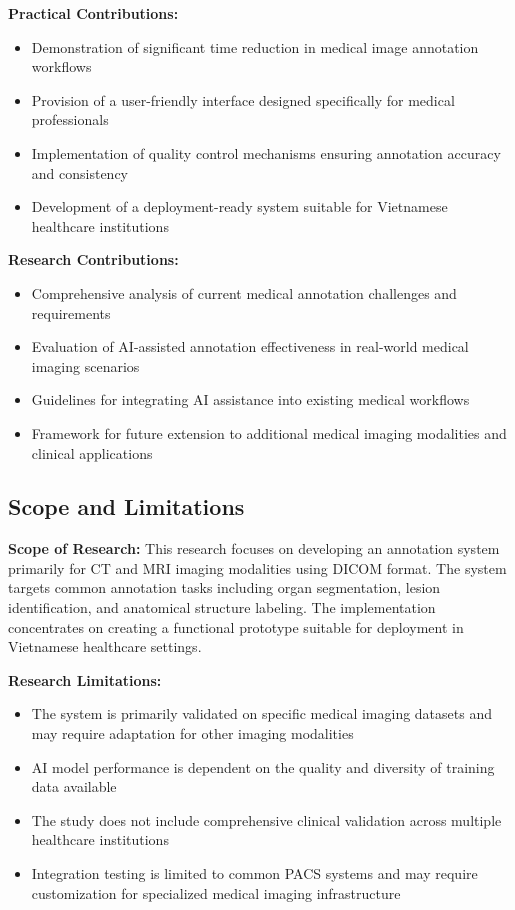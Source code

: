 \textbf{Practical Contributions:}
\begin{itemize}
    \item Demonstration of significant time reduction in medical image annotation workflows
    \item Provision of a user-friendly interface designed specifically for medical professionals
    \item Implementation of quality control mechanisms ensuring annotation accuracy and consistency
    \item Development of a deployment-ready system suitable for Vietnamese healthcare institutions
\end{itemize}

\textbf{Research Contributions:}
\begin{itemize}
    \item Comprehensive analysis of current medical annotation challenges and requirements
    \item Evaluation of AI-assisted annotation effectiveness in real-world medical imaging scenarios
    \item Guidelines for integrating AI assistance into existing medical workflows
    \item Framework for future extension to additional medical imaging modalities and clinical applications
\end{itemize}

\subsection{Scope and Limitations}

\textbf{Scope of Research:}
This research focuses on developing an annotation system primarily for CT and MRI imaging modalities using DICOM format. The system targets common annotation tasks including organ segmentation, lesion identification, and anatomical structure labeling. The implementation concentrates on creating a functional prototype suitable for deployment in Vietnamese healthcare settings.

\textbf{Research Limitations:}
\begin{itemize}
    \item The system is primarily validated on specific medical imaging datasets and may require adaptation for other imaging modalities
    \item AI model performance is dependent on the quality and diversity of training data available
    \item The study does not include comprehensive clinical validation across multiple healthcare institutions
    \item Integration testing is limited to common PACS systems and may require customization for specialized medical imaging infrastructure
\end{itemize}

